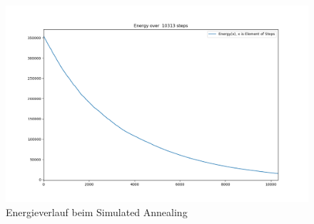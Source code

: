 \begin{figure}[H]\label{pic:Energy Annealing}
    \centering
    \includegraphics[width=\linewidth]{content/simulatedAnnealing/Bilder/Energy_10313_steps.png}
    \caption{Energieverlauf beim Simulated Annealing}
\end{figure}







